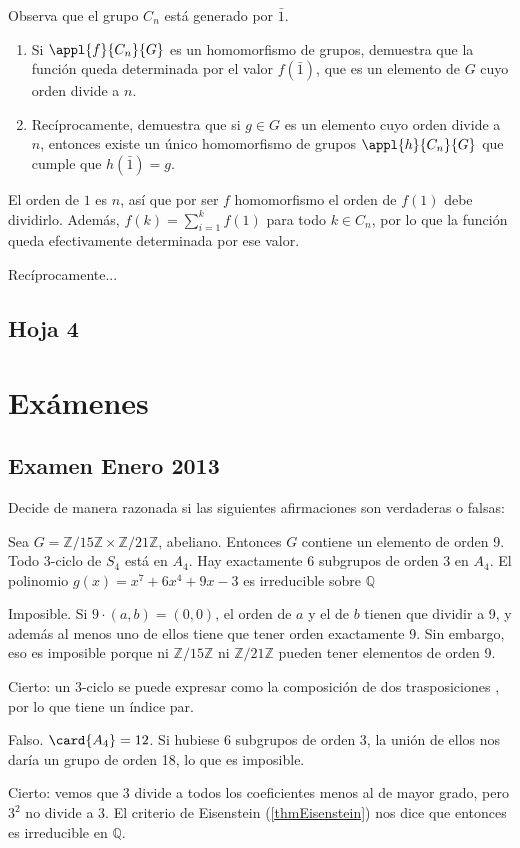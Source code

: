 \begin{problem}[11]

\ppart Observa que el grupo $C_n$ está generado por $\bar{1}$. 

\begin{enumerate}
\item Si $\appl{f}{C_n}{G}$ es un homomorfismo de grupos, demuestra que la función queda determinada por el valor $f(\bar{1})$, que es un elemento de $G$ cuyo orden divide a $n$.
\item Recíprocamente, demuestra que si $g∈G$ es un elemento cuyo orden divide a $n$, entonces existe un único homomorfismo de grupos $\appl{h}{C_n}{G}$ que cumple que $h(\bar{1}) = g$.
\end{enumerate}

\solution 

\ppart El orden de $1$ es $n$, así que por ser $f$ homomorfismo el orden de $f(1)$ debe dividirlo. Además, $f(k) = \sum_{i=1}^k f(1)$ para todo $k∈C_n$, por lo que la función queda efectivamente determinada por ese valor.

Recíprocamente...
\end{problem}

\subsection{Hoja 4}

\section{Exámenes}

\subsection{Examen Enero 2013}

\begin{problem} Decide de manera razonada si las siguientes afirmaciones son verdaderas o falsas:

\ppart Sea $G = ℤ/15ℤ×ℤ/21ℤ$, abeliano. Entonces $G$ contiene un elemento de orden 9.
\ppart Todo 3-ciclo de $S_4$ está en $A_4$.
\ppart Hay exactamente 6 subgrupos de orden $3$ en $A_4$.
\ppart El polinomio $g(x) = x^7 + 6x^4 + 9x -3$ es irreducible sobre $ℚ$

\solution

\spart Imposible. Si $9\cdot(a,b) = (0,0)$, el orden de $a$ y el de $b$ tienen que dividir a 9, y además al menos uno de ellos tiene que tener orden exactamente 9. Sin embargo, eso es imposible porque ni $ℤ/15ℤ$ ni $ℤ/21ℤ$ pueden tener elementos de orden 9. 

\spart Cierto: un 3-ciclo se puede expresar como la composición de dos trasposiciones , por lo que tiene un índice par.

\spart Falso. $\card{A_4} = 12$. Si hubiese 6 subgrupos de orden 3, la unión de ellos nos daría un grupo de orden 18, lo que es imposible.

\spart Cierto: vemos que 3 divide a todos los coeficientes menos al de mayor grado, pero $3^2$ no divide a 3. El criterio de Eisenstein (\ref{thmEisenstein}) nos dice que entonces es irreducible en $ℚ$.
\end{problem}

